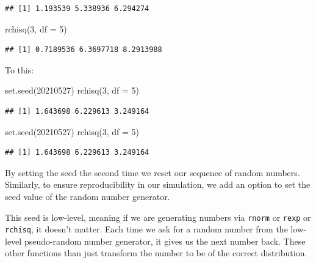 \documentclass[
]{book}
\newenvironment{Shaded}{\begin{snugshade}}{\end{snugshade}}
\newcommand{\AttributeTok}[1]{\textcolor[rgb]{0.77,0.63,0.00}{#1}}
\newcommand{\DecValTok}[1]{\textcolor[rgb]{0.00,0.00,0.81}{#1}}
\newcommand{\FunctionTok}[1]{\textcolor[rgb]{0.00,0.00,0.00}{#1}}
\newcommand{\NormalTok}[1]{#1}
\begin{document}
\begin{verbatim}
## [1] 1.193539 5.338936 6.294274
\end{verbatim}

\begin{Shaded}
\begin{Highlighting}[]
\FunctionTok{rchisq}\NormalTok{(}\DecValTok{3}\NormalTok{, }\AttributeTok{df =} \DecValTok{5}\NormalTok{)}
\end{Highlighting}
\end{Shaded}

\begin{verbatim}
## [1] 0.7189536 6.3697718 8.2913988
\end{verbatim}

To this:

\begin{Shaded}
\begin{Highlighting}[]
\FunctionTok{set.seed}\NormalTok{(}\DecValTok{20210527}\NormalTok{)}
\FunctionTok{rchisq}\NormalTok{(}\DecValTok{3}\NormalTok{, }\AttributeTok{df =} \DecValTok{5}\NormalTok{)}
\end{Highlighting}
\end{Shaded}

\begin{verbatim}
## [1] 1.643698 6.229613 3.249164
\end{verbatim}

\begin{Shaded}
\begin{Highlighting}[]
\FunctionTok{set.seed}\NormalTok{(}\DecValTok{20210527}\NormalTok{)}
\FunctionTok{rchisq}\NormalTok{(}\DecValTok{3}\NormalTok{, }\AttributeTok{df =} \DecValTok{5}\NormalTok{)}
\end{Highlighting}
\end{Shaded}

\begin{verbatim}
## [1] 1.643698 6.229613 3.249164
\end{verbatim}

By setting the seed the second time we reset our sequence of random numbers.
Similarly, to ensure reproducibility in our simulation, we add an option to set the seed value of the random number generator.

This seed is low-level, meaning if we are generating numbers via \texttt{rnorm} or \texttt{rexp} or \texttt{rchisq}, it doesn't matter.
Each time we ask for a random number from the low-level pseudo-random number generator, it gives us the next number back.
These other functions than just transform the number to be of the correct distribution.
\end{document}
